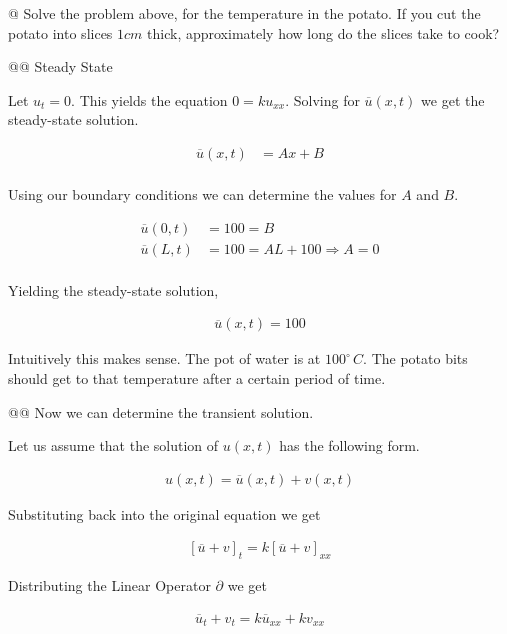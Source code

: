 \documentclass[10pt]{article}
\begin{document}
    \begin{easylist}[enumerate]
    @ Solve the problem above, for the temperature in the potato. If you cut the potato into slices $1cm$ thick,
    approximately how long do the slices take to cook?

    @@ Steady State

    Let $u_t = 0$. This yields the equation $0 = k u_{xx}$. Solving for $\overline{u}(x, t)$ we get the steady-state
    solution.

    \begin{align*}
        \overline{u}(x, t) &= Ax + B\\
    \end{align*}

    Using our boundary conditions we can determine the values for $A$ and $B$.

    \begin{align*}
        \overline{u}(0, t) &= 100 = B\\
        \overline{u}(L, t) &= 100 = AL + 100 \Rightarrow A = 0\\
    \end{align*}

    Yielding the steady-state solution,

    \begin{align*}
        \overline{u}(x, t) = 100
    \end{align*}

    Intuitively this makes sense. The pot of water is at $100^\circ \, C$. The potato bits should get to that
    temperature after a certain period of time.

    @@ Now we can determine the transient solution.

    Let us assume that the solution of $u(x, t)$ has the following form.

    \begin{align*}
        u(x, t) = \overline{u}(x, t) + v(x, t)
    \end{align*}

    Substituting back into the original equation we get

    \begin{align*}
        {[\overline{u} + v]}_t = k {[\overline{u} + v]}_{xx}
    \end{align*}

    Distributing the Linear Operator $\partial$ we get

    \begin{align*}
        \overline{u}_t + v_t = k\overline{u}_{xx} + kv_{xx}
    \end{align*}


\end{easylist}
\end{document}
